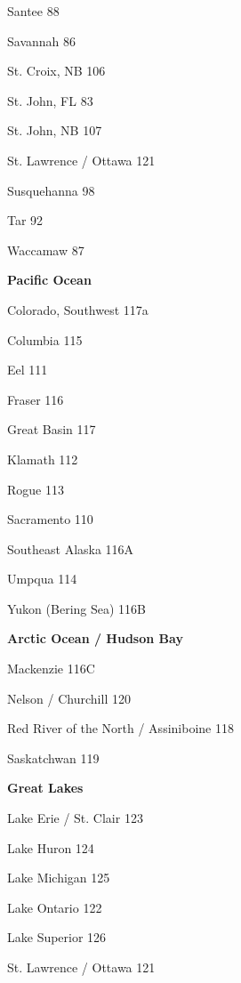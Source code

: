 Santee 88

Savannah 86

St. Croix, NB 106

St. John, FL 83

St. John, NB 107

St. Lawrence / Ottawa 121

Susquehanna 98

Tar 92

Waccamaw 87

\textbf{Pacific Ocean}

Colorado, Southwest 117a

Columbia 115

Eel 111

Fraser 116

Great Basin 117

Klamath 112

Rogue 113

Sacramento 110

Southeast Alaska 116A

Umpqua 114

Yukon (Bering Sea) 116B

\textbf{Arctic Ocean / Hudson Bay}

Mackenzie 116C

Nelson / Churchill 120

Red River of the North / Assiniboine 118

Saskatchwan 119

\textbf{Great Lakes}

Lake Erie / St. Clair 123

Lake Huron 124

Lake Michigan 125

Lake Ontario 122

Lake Superior 126

St. Lawrence / Ottawa 121
